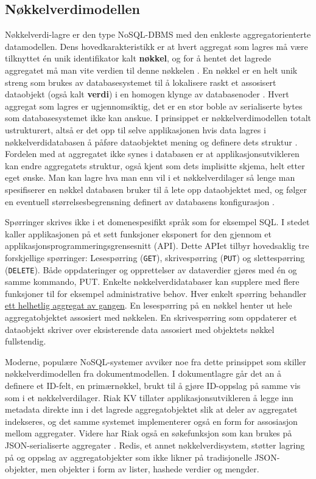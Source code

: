 \subsection{Nøkkelverdimodellen}

Nøkkelverdi-lagre er den type NoSQL-DBMS med den enkleste aggregatorienterte datamodellen. Dens hovedkarakteristikk er at hvert aggregat som lagres må være tilknyttet én unik identifikator kalt \textbf{nøkkel}, og for å hentet det lagrede aggregatet må man vite verdien til denne nøkkelen \citep{elmasri2014}. En nøkkel er en helt unik streng som brukes av databasesystemet til å lokalisere raskt et assosisert dataobjekt (også kalt \textbf{verdi}) i en homogen klynge av databasenoder \citep{elmasri2014}. Hvert aggregat som lagres er ugjennomsiktig, det er en stor boble av serialiserte bytes som databasesystemet ikke kan anskue. I prinsippet er nøkkel\-verdi\-modellen totalt ustrukturert, altså er det opp til selve applikasjonen hvis data lagres i nøkkelverdidatabasen å påføre dataobjektet mening og definere dets struktur \citep{elmasri2014}. Fordelen med at aggregatet ikke synes i databasen er at applikasjonsutvikleren kan endre aggregatets struktur, også kjent som dets implisitte skjema, helt etter eget ønske. Man kan lagre hva man enn vil i et nøkkelverdilager så lenge man spesifiserer en nøkkel databasen bruker til å lete opp dataobjektet med, og følger en eventuell størrelsesbegrensning definert av databasens konfigurasjon \citep{sadalage2013}.

Spørringer skrives ikke i et domenespesifikt språk som for eksempel SQL. I stedet kaller applikasjonen på et sett funksjoner eksponert for den gjennom et applikasjonsprogrammeringsgrensesnitt (API). Dette APIet tilbyr hovedsaklig tre forskjellige spørringer: Lesespørring (\texttt{GET}), skrivespørring (\texttt{PUT}) og slettespørring (\texttt{DELETE}). Både oppdateringer og opprettelser av dataverdier gjøres med én og samme kommando, PUT. Enkelte nøkkelverdidatabaser kan supplere med flere funksjoner til for eksempel administrative behov. Hver enkelt spørring behandler \underline{ett helhetlig aggregat av gangen}. En lesespørring på en nøkkel henter ut hele aggregatobjektet assosiert med nøkkelen. En skrivespørring som oppdaterer et dataobjekt skriver over eksisterende data assosiert med objektets nøkkel fullstendig.

Moderne, populære NoSQL-systemer avviker noe fra dette prinsippet som skiller nøkkel\-verdi\-modellen fra dokumentmodellen. I dokumentlagre går det an å definere et ID-felt, en primærnøkkel, brukt til å gjøre ID-oppslag på samme vis som i et nøkkelverdilager. Riak KV tillater applikasjonsutvikleren å legge inn metadata direkte inn i det lagrede aggregatobjektet slik at deler av aggregatet indekseres, og det samme systemet implementerer også en form for assosiasjon mellom aggregater. Videre har Riak også en søkefunksjon som kan brukes på JSON-serialiserte aggregater \citep{sadalage2013}. Redis, et annet nøkkelverdisystem, støtter lagring på og oppslag av aggregatobjekter som ikke likner på tradisjonelle JSON-objekter, men objekter i form av lister, hashede verdier og mengder.

